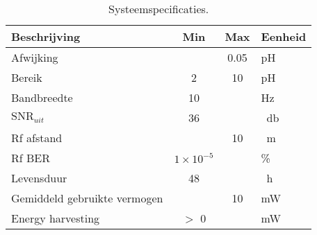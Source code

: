 \begin{table}[ht]
    \centering
    \begin{tabular}{|l|c c|l|}
        \hline
        Beschrijving                    & Min               & Max   & Eenheid           \\
        \hline 
        Afwijking                       &                   & 0.05  & pH                \\ 
        Bereik                          & 2                 & 10    & pH                \\
        Bandbreedte                     & 10                &       & Hz                \\
        $\mathrm{SNR}_{uit}$            & 36                &       & \qty{}{\decibel}  \\
        Rf afstand                      &                   & 10    & \qty{}{\meter}    \\
        Rf BER                          & $1\times10^{-5}$  &       & \%                \\
        Levensduur                      & 48                &       & \qty{}{\hour}     \\
        Gemiddeld gebruikte vermogen    &                   & 10    & mW                \\
        Energy harvesting               & $>$ 0             &       & mW                \\
        \hline
    \end{tabular}
    \caption{Systeemspecificaties.}
    \label{tab:systemSpecs}
\end{table}







